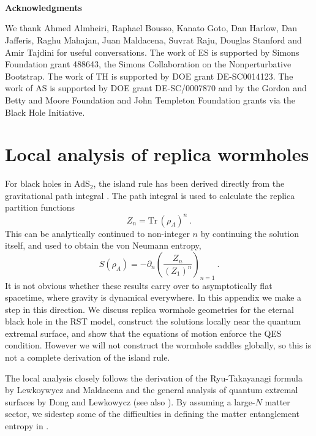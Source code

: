 \documentclass[12pt,oneside,letterpaper]{article}
\newcommand{\p}{\partial}
\newcommand{\be}{\begin{equation}}
\newcommand{\ee}{\end{equation}}
\def\be{\begin{eqnarray}}
\def\ee{\end{eqnarray}}
\newcommand{\tr}{\textrm{Tr}\,}
\def\be{\begin{equation}}
\def\ee{\end{equation}}
\renewcommand{\p}{\partial}
\numberwithin{equation}{section}
\def \be {\begin{equation}}
\def \ee {\end{equation}}
\begin{document}
\ \ 

\ \ 

\ \ 

\noindent \textbf{Acknowledgments}

\noindent We thank Ahmed Almheiri, Raphael Bousso, Kanato Goto, Dan Harlow, Dan Jafferis, Raghu Mahajan, Juan Maldacena, Suvrat Raju, Douglas Stanford and Amir Tajdini for useful conversations. The work of ES is supported by Simons Foundation grant 488643, the Simons Collaboration on the Nonperturbative Bootstrap. The work of TH is supported by DOE grant  DE-SC0014123. The work of AS is supported by DOE  grant DE-SC/0007870 and by the Gordon and Betty and Moore Foundation and John Templeton Foundation grants via the Black Hole Initiative. 





\appendix

\section{Local analysis of replica wormholes}

For black holes in AdS$_2$, the island rule has been derived directly from the gravitational path integral \cite{Almheiri:2019qdq,Penington:2019kki}. The path integral is used to calculate the replica partition functions
\be
Z_n = \tr (\rho_A)^n \ .
\ee
This can be analytically continued to non-integer $n$ by continuing the solution itself, and used to obtain the von Neumann entropy,
\be\label{replicaS}
S(\rho_A) =  - \p_n \left( \frac{Z_n}{(Z_1)^n} \right)_{n=1} \ .
\ee
It is not obvious whether these results carry over to asymptotically flat spacetime, where gravity is dynamical everywhere. In this appendix we make a step in this direction. We discuss replica wormhole geometries for the eternal black hole in the RST model, construct the solutions locally near the quantum extremal surface, and show that the equations of motion enforce the QES condition. However we will not construct the wormhole saddles globally, so this is not a complete derivation of the island rule.

The local analysis closely follows the derivation of the Ryu-Takayanagi formula by Lewkoywycz and Maldacena \cite{Lewkowycz:2013nqa} and the general analysis of quantum extremal surfaces by Dong and Lewkowycz \cite{Dong:2017xht} (see also \cite{Dong:2016hjy}). By assuming a large-$N$ matter sector, we sidestep some of the difficulties in defining the matter entanglement entropy in \cite{Dong:2017xht}.
\end{document}
